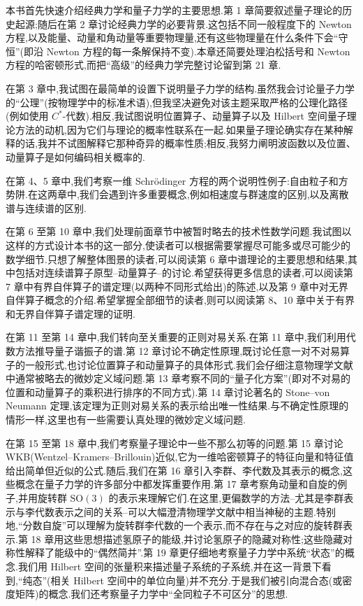 \documentclass[traditional=false,draftmark=false,colors=true,fontsetup=feec-fonts.tex,titlesetup=titles-setup.tex]{AJbook}
\begin{document}
本书首先快速介绍经典力学和量子力学的主要思想.第 1 章简要叙述量子理论的历史起源;随后在第 2 章讨论经典力学的必要背景.这包括不同一般程度下的 Newton 方程,以及能量、动量和角动量等重要物理量,还有这些物理量在什么条件下会“守恒”(即沿 Newton 方程的每一条解保持不变).本章还简要处理泊松括号和 Newton 方程的哈密顿形式,而把“高级”的经典力学完整讨论留到第 21 章.

在第 3 章中,我试图在最简单的设置下说明量子力学的结构.虽然我会讨论量子力学的“公理”(按物理学中的标准术语),但我坚决避免对该主题采取严格的公理化路径(例如使用 $C^*$-代数).相反,我试图说明位置算子、动量算子以及 Hilbert 空间量子理论方法的动机,因为它们与理论的概率性联系在一起.如果量子理论确实存在某种解释的话,我并不试图解释它那种奇异的概率性质;相反,我努力阐明波函数以及位置、动量算子是如何编码相关概率的.

在第 4、5 章中,我们考察一维 Schrödinger 方程的两个说明性例子:自由粒子和方势阱.在这两章中,我们会遇到许多重要概念,例如相速度与群速度的区别,以及离散谱与连续谱的区别.

在第 6 至第 10 章中,我们处理前面章节中被暂时略去的技术性数学问题.我试图以这样的方式设计本书的这一部分,使读者可以根据需要掌握尽可能多或尽可能少的数学细节.只想了解整体图景的读者,可以阅读第 6 章中谱理论的主要思想和结果,其中包括对连续谱算子原型--动量算子--的讨论.希望获得更多信息的读者,可以阅读第 7 章中有界自伴算子的谱定理(以两种不同形式给出)的陈述,以及第 9 章中对无界自伴算子概念的介绍.希望掌握全部细节的读者,则可以阅读第 8、10 章中关于有界和无界自伴算子谱定理的证明.

在第 11 至第 14 章中,我们转向至关重要的正则对易关系.在第 11 章中,我们利用代数方法推导量子谐振子的谱.第 12 章讨论不确定性原理,既讨论任意一对不对易算子的一般形式,也讨论位置算子和动量算子的具体形式.我们会仔细注意物理学文献中通常被略去的微妙定义域问题.第 13 章考察不同的“量子化方案”(即对不对易的位置和动量算子的乘积进行排序的不同方式).第 14 章讨论著名的 Stone--von Neumann 定理,该定理为正则对易关系的表示给出唯一性结果.与不确定性原理的情形一样,这里也有一些需要认真处理的微妙定义域问题.

在第 15 至第 18 章中,我们考察量子理论中一些不那么初等的问题.第 15 章讨论 WKB(Wentzel--Kramers--Brillouin)近似,它为一维哈密顿算子的特征向量和特征值给出简单但近似的公式.随后,我们在第 16 章引入李群、李代数及其表示的概念,这些概念在量子力学的许多部分中都发挥重要作用.第 17 章考察角动量和自旋的例子,并用旋转群 $\mathrm{SO}(3)$ 的表示来理解它们.在这里,更偏数学的方法--尤其是李群表示与李代数表示之间的关系--可以大幅澄清物理学文献中相当神秘的主题.特别地,“分数自旋”可以理解为旋转群李代数的一个表示,而不存在与之对应的旋转群表示.第 18 章用这些思想描述氢原子的能级,并讨论氢原子的隐藏对称性;这些隐藏对称性解释了能级中的“偶然简并”.第 19 章更仔细地考察量子力学中系统“状态”的概念.我们用 Hilbert 空间的张量积来描述量子系统的子系统,并在这一背景下看到,“纯态”(相关 Hilbert 空间中的单位向量)并不充分.于是我们被引向混合态(或密度矩阵)的概念.我们还考察量子力学中“全同粒子不可区分”的思想.
\end{document}
